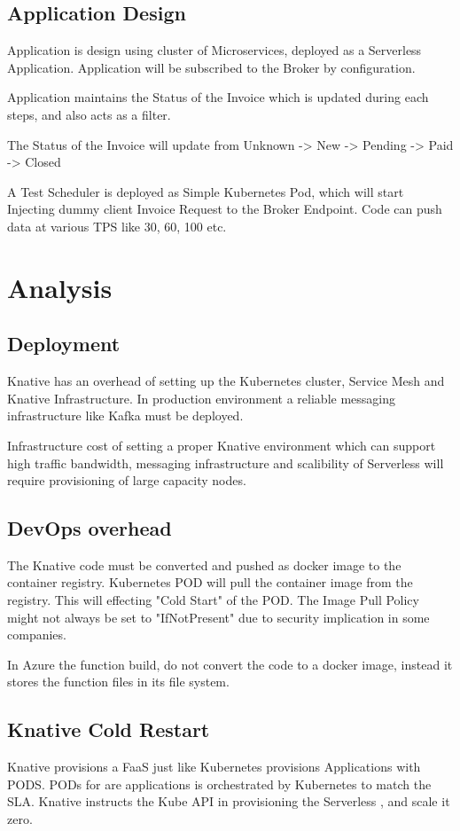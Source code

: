\documentclass[12pt]{article}
\begin{document}
\begin{flushleft}
\begin{figure}[h]
\end{figure}


\subsection{Application Design}
Application is design using cluster of Microservices, deployed as a Serverless Application. 
Application will be subscribed to the Broker by configuration.

Application maintains the Status of the Invoice which is updated during each steps, and also acts as a filter.

The Status of the Invoice will update from Unknown -> New -> Pending -> Paid -> Closed

A Test Scheduler is deployed as Simple Kubernetes Pod, which will start Injecting dummy client Invoice Request to the Broker Endpoint. Code can push data at various TPS like 30, 60, 100 etc.


\section{Analysis}
\subsection{Deployment}
Knative has an overhead of setting up the Kubernetes cluster, Service Mesh and Knative Infrastructure. In production environment a reliable messaging infrastructure like Kafka must be deployed.

Infrastructure cost of setting a proper Knative environment which can support high traffic bandwidth, messaging infrastructure and scalibility of Serverless will require provisioning of large capacity nodes.

\subsection{DevOps overhead}
The Knative code must be converted and pushed as docker image to the container registry. 
Kubernetes POD will pull the container image from the registry. This will effecting "Cold Start" of the POD. 
The Image Pull Policy might not always be set to "IfNotPresent" due to security implication in some companies. 

In Azure the function build, do not convert the code to a docker image, instead it stores the function files in its file system.

\subsection{Knative Cold Restart}
Knative provisions a FaaS just like Kubernetes  provisions Applications with PODS. PODs for are applications is orchestrated by Kubernetes to match the SLA. Knative instructs the Kube API in provisioning the Serverless , and scale it zero.  


\end{flushleft}
\end{document}
